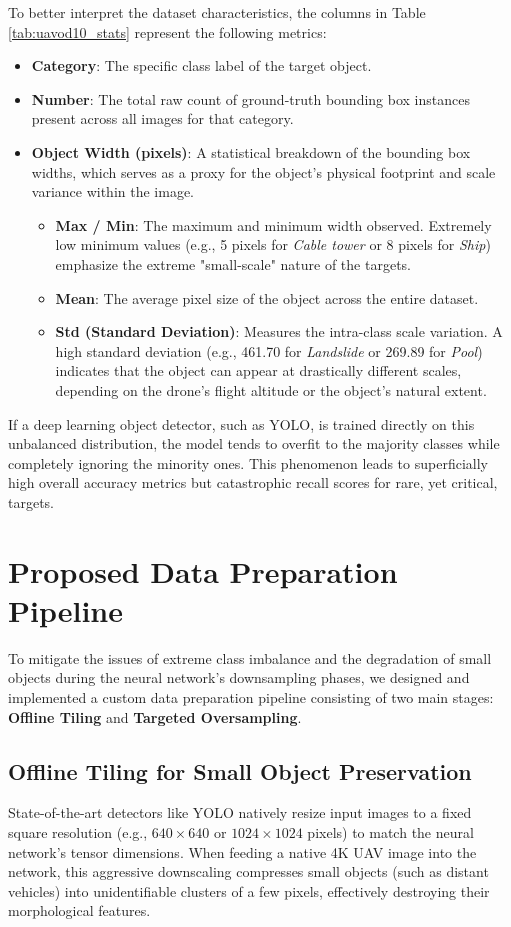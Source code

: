 To better interpret the dataset characteristics, the columns in Table \ref{tab:uavod10_stats} represent the following metrics:
\begin{itemize}
    \item \textbf{Category}: The specific class label of the target object.
    \item \textbf{Number}: The total raw count of ground-truth bounding box instances present across all images for that category.
    \item \textbf{Object Width (pixels)}: A statistical breakdown of the bounding box widths, which serves as a proxy for the object's physical footprint and scale variance within the image.
    \begin{itemize}
        \item \textbf{Max / Min}: The maximum and minimum width observed. Extremely low minimum values (e.g., 5 pixels for \textit{Cable tower} or 8 pixels for \textit{Ship}) emphasize the extreme "small-scale" nature of the targets.
        \item \textbf{Mean}: The average pixel size of the object across the entire dataset.
        \item \textbf{Std (Standard Deviation)}: Measures the intra-class scale variation. A high standard deviation (e.g., 461.70 for \textit{Landslide} or 269.89 for \textit{Pool}) indicates that the object can appear at drastically different scales, depending on the drone's flight altitude or the object's natural extent.
    \end{itemize}
\end{itemize}

If a deep learning object detector, such as YOLO, is trained directly on this unbalanced distribution, the model tends to overfit to the majority classes while completely ignoring the minority ones. This phenomenon leads to superficially high overall accuracy metrics but catastrophic recall scores for rare, yet critical, targets.

\section{Proposed Data Preparation Pipeline}
To mitigate the issues of extreme class imbalance and the degradation of small objects during the neural network's downsampling phases, we designed and implemented a custom data preparation pipeline consisting of two main stages: \textbf{Offline Tiling} and \textbf{Targeted Oversampling}.

\subsection{Offline Tiling for Small Object Preservation}
State-of-the-art detectors like YOLO natively resize input images to a fixed square resolution (e.g., $640 \times 640$ or $1024 \times 1024$ pixels) to match the neural network's tensor dimensions. When feeding a native 4K UAV image into the network, this aggressive downscaling compresses small objects (such as distant vehicles) into unidentifiable clusters of a few pixels, effectively destroying their morphological features.


